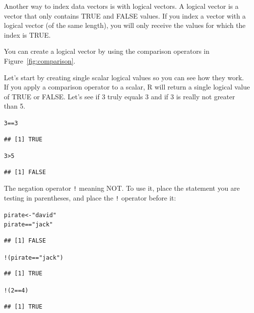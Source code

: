 \documentclass{tufte-book}\usepackage[]{graphicx}\usepackage[]{color}
\makeatletter
\newcommand{\hlnum}[1]{\textcolor[rgb]{0.686,0.059,0.569}{#1}}%
\newcommand{\hlstr}[1]{\textcolor[rgb]{0.192,0.494,0.8}{#1}}%
\newcommand{\hlopt}[1]{\textcolor[rgb]{0,0,0}{#1}}%
\newcommand{\hlstd}[1]{\textcolor[rgb]{0.345,0.345,0.345}{#1}}%
\newcommand{\hlkwb}[1]{\textcolor[rgb]{0.69,0.353,0.396}{#1}}%
\newenvironment{kframe}{%
 \def\at@end@of@kframe{}%
 \ifinner\ifhmode%
  \def\at@end@of@kframe{\end{minipage}}%
  \begin{minipage}{\columnwidth}%
 \fi\fi%
 \def\FrameCommand##1{\hskip\@totalleftmargin \hskip-\fboxsep
 \colorbox{shadecolor}{##1}\hskip-\fboxsep
     \hskip-\linewidth \hskip-\@totalleftmargin \hskip\columnwidth}%
 \MakeFramed {\advance\hsize-\width
   \@totalleftmargin\z@ \linewidth\hsize
   \@setminipage}}%
 {\par\unskip\endMakeFramed%
 \at@end@of@kframe}
\newenvironment{knitrout}{}{} %
\makeatother
\begin{document}
Another way to index data vectors is with logical vectors. A logical vector is a vector that only contains TRUE and FALSE values. If you index a vector with a logical vector (of the same length), you will only receive the values for which the index is TRUE.

You can create a logical vector by using the comparison operators in Figure~\ref{fig:comparison}.

Let's start by creating single scalar logical values so you can see how they work. If you apply a comparison operator to a scalar, R will return a single logical value of TRUE or FALSE. Let's see if 3 truly equals 3 and if 3 is really not greater than 5.


\begin{knitrout}
\color{fgcolor}\begin{kframe}
\begin{alltt}
\hlnum{3} \hlopt{==} \hlnum{3}
\end{alltt}
\begin{verbatim}
## [1] TRUE
\end{verbatim}
\begin{alltt}
\hlnum{3} \hlopt{>} \hlnum{5}
\end{alltt}
\begin{verbatim}
## [1] FALSE
\end{verbatim}
\end{kframe}
\end{knitrout}


The negation operator \texttt{!} meaning NOT. To use it, place the statement you are testing in parentheses, and place the \texttt{!} operator before it:


\begin{knitrout}
\color{fgcolor}\begin{kframe}
\begin{alltt}
\hlstd{pirate} \hlkwb{<-} \hlstr{"david"}
\hlstd{pirate} \hlopt{==} \hlstr{"jack"}
\end{alltt}
\begin{verbatim}
## [1] FALSE
\end{verbatim}
\begin{alltt}
\hlopt{!}\hlstd{(pirate} \hlopt{==} \hlstr{"jack"}\hlstd{)}
\end{alltt}
\begin{verbatim}
## [1] TRUE
\end{verbatim}
\begin{alltt}
\hlopt{!}\hlstd{(}\hlnum{2} \hlopt{==} \hlnum{4}\hlstd{)}
\end{alltt}
\begin{verbatim}
## [1] TRUE
\end{verbatim}
\end{kframe}
\end{knitrout}
\end{document}
